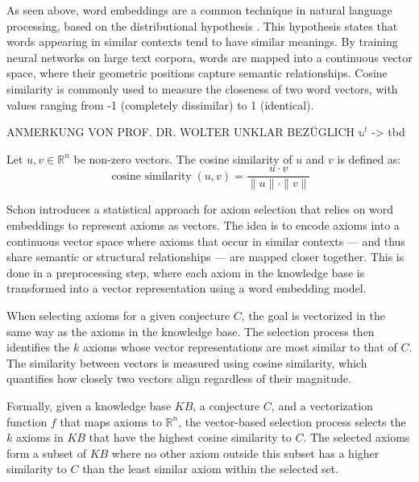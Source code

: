 \documentclass[english,version-2020-11]{uzl-thesis}
\begin{document}
As seen above, word embeddings are a common technique in natural language processing, based on the distributional hypothesis \cite{Miller1991}. This hypothesis states that words appearing in similar contexts tend to have similar meanings. By training neural networks on large text corpora, words are mapped into a continuous vector space, where their geometric positions capture semantic relationships. Cosine similarity is commonly used to measure the closeness of two word vectors, with values ranging from -1 (completely dissimilar) to 1 (identical).

ANMERKUNG VON PROF. DR. WOLTER UNKLAR BEZÜGLICH \( \mathbb{u}^t \)  
-> tbd  

\begin{definition}
    Let \( u, v \in \mathbb{R}^n \) be non-zero vectors. The cosine similarity of \( u \) and \( v \) is defined as:
    \begin{equation}
        \operatorname{cosine\ similarity}(u, v) = \frac{u \cdot v}{\|u\| \cdot \|v\|}
    \end{equation}
\end{definition}

Schon \cite{Schon2023} introduces a statistical approach for axiom selection that relies on word embeddings to represent axioms as vectors. The idea is to encode axioms into a continuous vector space where axioms that occur in similar contexts — and thus share semantic or structural relationships — are mapped closer together. This is done in a preprocessing step, where each axiom in the knowledge base is transformed into a vector representation using a word embedding model.

When selecting axioms for a given conjecture \( C \), the goal is vectorized in the same way as the axioms in the knowledge base. The selection process then identifies the \( k \) axioms whose vector representations are most similar to that of \( C \). The similarity between vectors is measured using cosine similarity, which quantifies how closely two vectors align regardless of their magnitude.

Formally, given a knowledge base \( KB \), a conjecture \( C \), and a vectorization function \( f \) that maps axioms to \( \mathbb{R}^n \), the vector-based selection process selects the \( k \) axioms in \( KB \) that have the highest cosine similarity to \( C \). The selected axioms form a subset of \( KB \) where no other axiom outside this subset has a higher similarity to \( C \) than the least similar axiom within the selected set.
\end{document}
